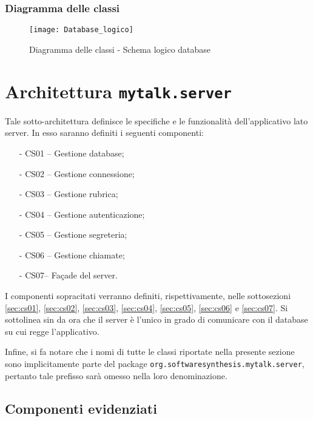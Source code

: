 \subsubsection{Diagramma delle classi}
\begin{figure}[H]
\begin{center}
\texttt{[image: Database\_logico]}
\caption{Diagramma delle classi - Schema logico database}\label{fig:database_logico}
\end{center}
\end{figure}
\clearpage


\section{Architettura \texttt{mytalk.server}}\label{sec:server}
Tale sotto-architettura definisce le specifiche e le funzionalità dell'applicativo lato server. In esso saranno definiti i seguenti componenti:
\begin{itemize}[noitemsep,nolistsep]
	\item[-] \textsf{CS01 -- Gestione database};
	\item[-] \textsf{CS02 -- Gestione connessione};
	\item[-] \textsf{CS03 -- Gestione rubrica};
	\item[-] \textsf{CS04 -- Gestione autenticazione};
	\item[-] \textsf{CS05 -- Gestione segreteria};
	\item[-] \textsf{CS06 -- Gestione chiamate};
	\item[-] \textsf{CS07-- Façade del server}.
\end{itemize}

I componenti sopracitati verranno definiti, rispettivamente, nelle sottosezioni \ref{sec:cs01}, \ref{sec:cs02}, \ref{sec:cs03}, \ref{sec:cs04}, \ref{sec:cs05}, \ref{sec:cs06} e \ref{sec:cs07}. Si sottolinea sin da ora che il server è l'unico in grado di comunicare con il database su cui regge l'applicativo.

Infine, si fa notare che i nomi di tutte le classi riportate nella presente sezione sono implicitamente parte del package \texttt{org.softwaresynthesis.mytalk.server}, pertanto tale prefisso sarà omesso nella loro denominazione.

\subsection{Componenti evidenziati}

